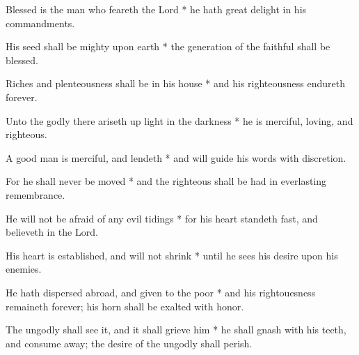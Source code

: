 Blessed is the man who feareth the Lord * he hath great delight in his commandments.

His seed shall be mighty upon earth * the generation of the faithful shall be blessed.
	
Riches and plenteousness shall be in his house * and his righteousness endureth forever.
	
Unto the godly there ariseth up light in the darkness * he is merciful, loving, and righteous.
	
A good man is merciful, and lendeth * and will guide his words with discretion.
	
For he shall never be moved * and the righteous shall be had in everlasting remembrance.
	
He will not be afraid of any evil tidings * for his heart standeth fast, and believeth in the Lord.
	
His heart is established, and will not shrink * until he sees his desire upon his enemies.
	
He hath dispersed abroad, and given to the poor * and his rightouesness remaineth forever; his horn shall be exalted with honor.
	
The ungodly shall see it, and it shall grieve him * he shall gnash with his teeth, and consume away; the desire of the ungodly shall perish.